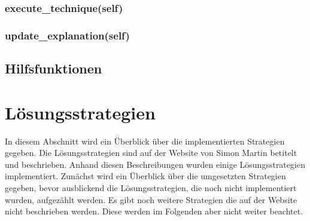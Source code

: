\subsubsection{execute\_technique(self)}
\subsubsection{update\_explanation(self)}

\subsection{Hilfsfunktionen}

\section{Lösungsstrategien}

In diesem Abschnitt wird ein Überblick über die implementierten Strategien gegeben. Die Lösungsstrategien sind auf der Website von Simon Martin \cite{martin} betitelt und beschrieben. Anhand diesen Beschreibungen wurden einige Lösungsstrategien implementiert. Zunächst wird ein Überblick über die umgesetzten Strategien gegeben, bevor ausblickend die Lösungsstrategien, die noch nicht implementiert wurden, aufgezählt werden. Es gibt noch weitere Strategien die auf der Website nicht beschrieben werden. Diese werden im Folgenden aber nicht weiter beachtet.

